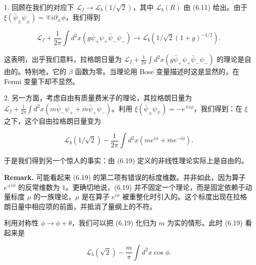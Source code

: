 1. 回顾在我们的对应下 $\mathcal{L}_f\to\mathcal{L}_b(1/\sqrt2)$，其中 $\mathcal{L}_b(R)$ 由 (6.11) 给出。由于 $\xi(\bar\psi_\pm\psi_\pm)=\mp i\partial_\pm\phi$，我们得到

\begin{equation}
  \tag{6.18}
  \label{eq:6-18}
  \mathcal{L}_f+\frac{1}{2\pi}\int d^2x\left(g\bar\psi_+\psi_+\bar\psi_-\psi_-\right)\to\mathcal{L}_b\left(1/\sqrt2(1+g)^{-1/2}\right).
\end{equation}

这表明，出乎我们意料，拉格朗日量为 $\mathcal{L}_f+\frac{1}{2\pi}\int d^2x(g\bar\psi_+\psi_+\bar\psi_-\psi_-)$ 的理论是自由的。特别地，它的 $\beta$ 函数为零。当理论用 Bose 变量描述时这是显然的，在 Fermi 变量下却不显然。

2. 另一方面，考虑自由有质量费米子的理论，其拉格朗日量为 $\mathcal{L}_f+\frac{1}{2\pi}\int d^2x(m\bar\psi_-\psi_++\bar m\bar\psi_+\psi_-)$。利用 $\xi(\bar\psi_\pm\psi_\mp)=-e^{\mp i\phi}$，我们得到：在 $\xi$ 之下，这个自由拉格朗日量变为

\begin{equation}
  \tag{6.19}
  \label{eq:6-19}
  \mathcal{L}_b\left(1/\sqrt2\right)-\frac{1}{2\pi}\int d^2x\left(me^{i\phi}+\bar m e^{-i\phi}\right).
\end{equation}

于是我们得到另一个惊人的事实：由 (6.19) 定义的非线性理论实际上是自由的。

\textbf{Remark.} 可能看起来 (6.19) 的第二项有错误的标度维数。并非如此，因为算子 $e^{\pm i\phi}$ 的反常维数为 $1$。更确切地说，(6.19) 并不固定一个理论，而是固定依赖于动量标度 $\mu$ 的一族理论，$\mu$ 是在算子 $e^{i\phi}$ 被重整化时引入的。这个标度出现在拉格朗日量中相应项的前面，并抵消了量纲上的不符。

利用对称性 $\phi\to\phi+\theta$，我们可以把 (6.19) 化归为 $m$ 为实的情形。此时 (6.19) 看起来是

\begin{equation}
  \tag{6.20}
  \label{eq:6-20}
  \mathcal{L}_b\left(\sqrt2\right)-\frac{m}{\pi}\int d^2x\cos\phi.
\end{equation}



